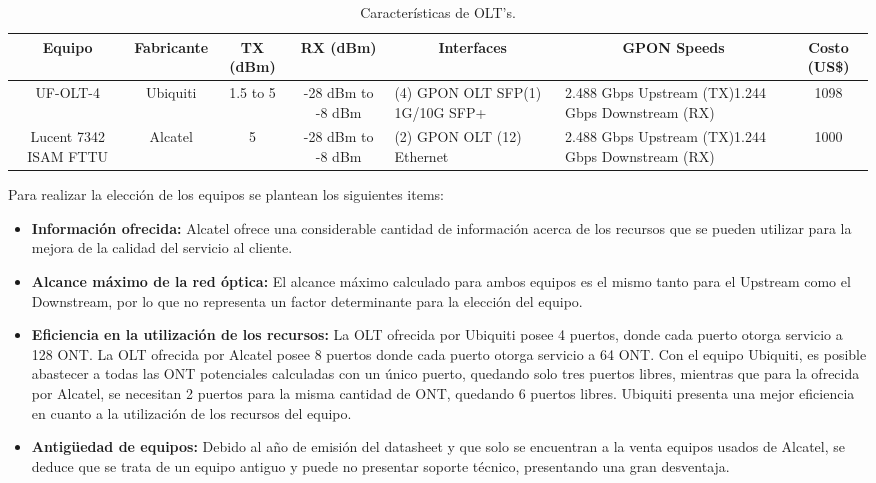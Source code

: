 \begin{enumerate}
\begin{enumerate}
\begin{table}[H]
  \tiny
  \centering  
    \begin{tabular}{|c|c|c|c|p{5.335em}|p{7.665em}|c|}
    \hline
    \rowcolor[rgb]{ .773,  .851,  .945} \textbf{Equipo} & \textbf{Fabricante} & \textbf{TX (dBm)} & \textbf{RX (dBm)} & \multicolumn{1}{c|}{\textbf{Interfaces}} & \multicolumn{1}{c|}{\textbf{GPON Speeds}} & \textbf{Costo (US\$)} \bigstrut\\
    \hline
    UF-OLT-4 & Ubiquiti & 1.5  to 5  & -28 dBm to -8 dBm & (4) GPON OLT SFP\newline{}(1) 1G/10G SFP+ & 2.488 Gbps Upstream (TX)\newline{}1.244 Gbps Downstream (RX) & 1098 \bigstrut\\
    \hline
    Lucent 7342 ISAM FTTU & Alcatel & 5     & -28 dBm to -8 dBm & (2) GPON OLT \newline{}(12) Ethernet  & 2.488 Gbps Upstream (TX)\newline{}1.244 Gbps Downstream (RX) & 1000 \bigstrut\\
    \hline
    \end{tabular}%
	\caption{Características de OLT's.}
  \label{tab:caracteristicas-olt}%
\end{table}%



Para realizar la elección de los equipos se plantean los siguientes items:

\begin{itemize}
\item \textbf{ Información ofrecida:} Alcatel ofrece una considerable cantidad de información acerca de los recursos que se pueden utilizar para la mejora de la calidad del servicio al cliente.
\item \textbf{ Alcance máximo de la red  óptica:} El alcance máximo calculado para ambos equipos es el mismo tanto para el Upstream como el Downstream, por lo que no representa un factor determinante para la elección del equipo.
\item \textbf{Eficiencia en la utilización de los recursos:} La OLT ofrecida por Ubiquiti posee 4 puertos, donde cada puerto otorga servicio a 128 ONT. La OLT ofrecida por Alcatel posee 8 puertos donde cada puerto otorga servicio a 64 ONT. Con el equipo Ubiquiti, es posible abastecer a todas las ONT potenciales calculadas con un único puerto, quedando solo tres puertos libres, mientras que para la ofrecida por Alcatel, se necesitan 2 puertos para la misma cantidad de ONT, quedando 6 puertos libres. Ubiquiti presenta una mejor eficiencia en cuanto a la utilización de los recursos del equipo.
\item \textbf{Antigüedad de equipos:} Debido al año de emisión del datasheet y que solo se encuentran a la venta equipos usados de Alcatel, se deduce que se trata de un equipo antiguo y puede no presentar soporte técnico, presentando una gran desventaja. 
\end{itemize}




\end{enumerate}
\end{enumerate}
